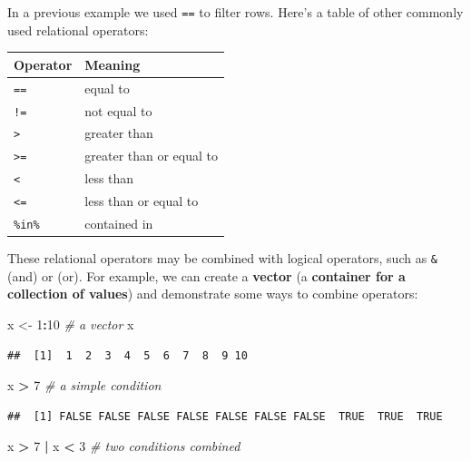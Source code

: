 \documentclass[
]{book}
\newenvironment{Shaded}{\begin{snugshade}}{\end{snugshade}}
\newcommand{\CommentTok}[1]{\textcolor[rgb]{0.56,0.35,0.01}{\textit{#1}}}
\newcommand{\DecValTok}[1]{\textcolor[rgb]{0.00,0.00,0.81}{#1}}
\newcommand{\NormalTok}[1]{#1}
\newcommand{\OperatorTok}[1]{\textcolor[rgb]{0.81,0.36,0.00}{\textbf{#1}}}
\newcommand{\StringTok}[1]{\textcolor[rgb]{0.31,0.60,0.02}{#1}}
\begin{document}
In a previous example we used \texttt{==} to filter rows.
Here's a table of other commonly used relational operators:

\begin{longtable}[]{@{}ll@{}}
\toprule
Operator & Meaning\tabularnewline
\midrule
\endhead
\texttt{==} & equal to\tabularnewline
\texttt{!=} & not equal to\tabularnewline
\texttt{\textgreater{}} & greater than\tabularnewline
\texttt{\textgreater{}=} & greater than or equal to\tabularnewline
\texttt{\textless{}} & less than\tabularnewline
\texttt{\textless{}=} & less than or equal to\tabularnewline
\texttt{\%in\%} & contained in\tabularnewline
\bottomrule
\end{longtable}

These relational operators may be combined with logical operators, such as \texttt{\&} (and) or \texttt{\textbar{}} (or).
For example, we can create a \textbf{vector} (a \textbf{container for a collection of values}) and demonstrate
some ways to combine operators:

\begin{Shaded}
\begin{Highlighting}[]
\NormalTok{x <-}\StringTok{ }\DecValTok{1}\OperatorTok{:}\DecValTok{10} \CommentTok{# a vector}
\NormalTok{x}
\end{Highlighting}
\end{Shaded}

\begin{verbatim}
##  [1]  1  2  3  4  5  6  7  8  9 10
\end{verbatim}

\begin{Shaded}
\begin{Highlighting}[]
\NormalTok{x }\OperatorTok{>}\StringTok{ }\DecValTok{7} \CommentTok{# a simple condition}
\end{Highlighting}
\end{Shaded}

\begin{verbatim}
##  [1] FALSE FALSE FALSE FALSE FALSE FALSE FALSE  TRUE  TRUE  TRUE
\end{verbatim}

\begin{Shaded}
\begin{Highlighting}[]
\NormalTok{x }\OperatorTok{>}\StringTok{ }\DecValTok{7} \OperatorTok{|}\StringTok{ }\NormalTok{x }\OperatorTok{<}\StringTok{ }\DecValTok{3} \CommentTok{# two conditions combined}
\end{Highlighting}
\end{Shaded}
\end{document}
